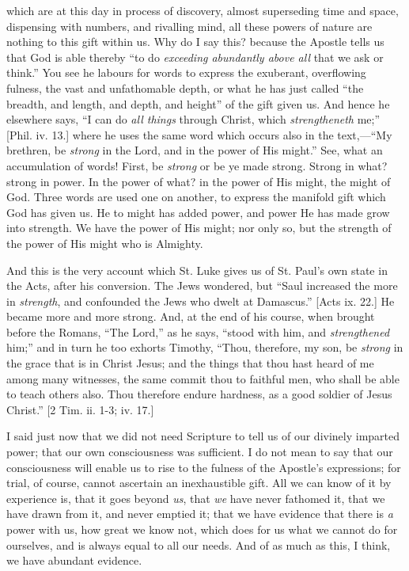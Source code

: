 which are at this day in process of discovery, almost superseding time
and space, dispensing with numbers, and rivalling mind, all these
powers of nature are nothing to this gift within us. Why do I say
this? because the Apostle tells us that God is able thereby ``to
do \emph{exceeding abundantly above all} that we ask or think.''
You see he labours for words to express the exuberant, overflowing
fulness, the vast and unfathomable depth, or what he has just called
``the breadth, and length, and depth, and height'' of the gift
given us. And hence he elsewhere says, ``I can do \emph{all things}
through Christ, which \emph{strengtheneth} me;'' [Phil. iv. 13.] where he
uses the same word which occurs also in the text,—``My brethren,
be \emph{strong} in the Lord, and in the power of His might.''
See, what an accumulation of words! First, be \emph{strong} or be ye
made strong. Strong in what? strong in power. In the power of what? in
the power of His might, the might of God. Three words are used one on
another, to express the manifold gift which God has given us. He to
might has added power, and power He has made grow into strength. We
have the power of His might; nor only so, but the strength of the
power of His might who is Almighty.

And this is the very account which St. Luke gives us of St. Paul's
own state in the Acts, after his conversion. The Jews wondered, but
``Saul increased the more in \emph{strength}, and confounded the
Jews who dwelt at Damascus.'' [Acts ix. 22.] He became more and
more strong. And, at the end of his course, when brought before the
Romans, ``The Lord,'' as he says, ``stood with him, and \emph{strengthened}
him;'' and in turn he too exhorts Timothy, ``Thou, therefore,
my son, be \emph{strong} in the grace that is in Christ Jesus; and the
things that thou hast heard of me among many witnesses, the same
commit thou to faithful men, who shall be able to teach others also.
Thou therefore endure hardness, as a good soldier of Jesus
Christ.'' [2 Tim. ii. 1-3; iv. 17.]

I said just now that we did not need Scripture to tell us of our
divinely imparted power; that our own consciousness was sufficient. I
do not mean to say that our consciousness will enable us to rise to
the fulness of the Apostle's expressions; for trial, of course, cannot
ascertain an inexhaustible gift. All we can know of it by experience
is, that it goes beyond \emph{us}, that \emph{we} have never fathomed
it, that we have drawn from it, and never emptied it; that we have
evidence that there is \emph{a} power with us, how great we know not,
which does for us what we cannot do for ourselves, and is always equal
to all our needs. And of as much as this, I think, we have abundant
evidence.

